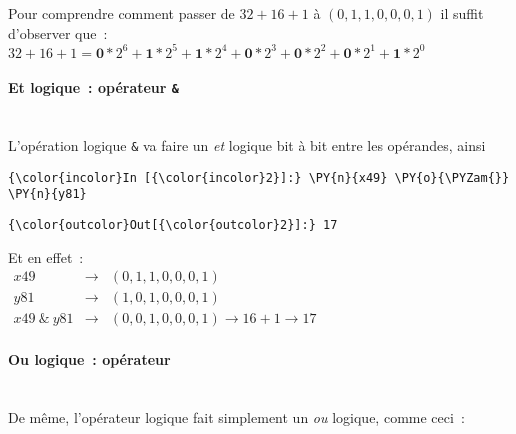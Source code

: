     Pour comprendre comment passer de \(32 + 16 + 1\) à \((0,1,1,0,0,0,1)\)
il suffit d'observer que~:\\

\(32 + 16 + 1 = \textbf{0}*2^6 + \textbf{1}*2^5 + \textbf{1}*2^4 + \textbf{0}*2^3 + \textbf{0}*2^2 + \textbf{0}*2^1 + \textbf{1}*2^0\)

    \hypertarget{et-logique-opuxe9rateur}{%
\paragraph{\texorpdfstring{Et logique~: opérateur
\texttt{\&}}{Et logique~: opérateur \&}\\\\}\label{et-logique-opuxe9rateur}}

    L'opération logique \texttt{\&} va faire un \emph{et} logique bit à bit
entre les opérandes, ainsi

    \begin{Verbatim}[commandchars=\\\{\}]
{\color{incolor}In [{\color{incolor}2}]:} \PY{n}{x49} \PY{o}{\PYZam{}} \PY{n}{y81}
\end{Verbatim}


\begin{Verbatim}[commandchars=\\\{\}]
{\color{outcolor}Out[{\color{outcolor}2}]:} 17
\end{Verbatim}
            
    Et en effet~:\\

\(\begin{array}{rcl} x49 & \rightarrow & (0,1,1,0,0,0,1) \\ y81 & \rightarrow & (1,0,1,0,0,0,1) \\ x49\ \&\ y81 & \rightarrow & (0,0,1,0,0,0,1) \rightarrow 16 + 1 \rightarrow 17 \end{array}\)

    \hypertarget{ou-logique-opuxe9rateur}{%
\paragraph{\texorpdfstring{Ou logique~: opérateur
\texttt{\textbar{}}}{Ou logique~: opérateur \textbar{}}\\\\}\label{ou-logique-opuxe9rateur}}

    De même, l'opérateur logique \texttt{\textbar{}} fait simplement un
\emph{ou} logique, comme ceci~:

